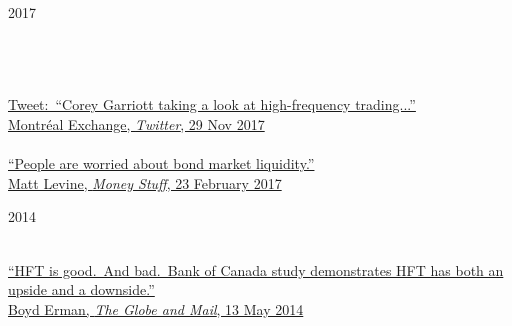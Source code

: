\documentclass[11pt,letterpaper]{article}
\begin{document}
\bigskip

\noindent
\begin{minipage}[ht]{0.15\textwidth}
2017 \\
\\
\\
\\
\end{minipage}
\begin{minipage}[ht]{0.80\textwidth}
\href{https://twitter.com/MtlExchange/status/935898152950992896}{Tweet:~``Corey Garriott taking a look at high-frequency trading...'' \\
Montr\'eal Exchange, \textit{Twitter}, 29 Nov 2017} \\
\\
\href{https://www.bloomberg.com/news/articles/2017-02-23/pboc-is-going-digital-as-mobile-payments-boom-transforms-economy}{``People are worried about bond market liquidity.'' \\
Matt Levine, \textit{Money Stuff}, 23 February 2017}
\end{minipage}

\bigskip

\noindent
\begin{minipage}[ht]{0.15\textwidth}
2014 \\
\\

\end{minipage}
\begin{minipage}[ht]{0.80\textwidth}
\href{https://www.theglobeandmail.com/report-on-business/streetwise/hft-is-good-and-bad/article18643811/}{``HFT is good.~And bad.~Bank of Canada study demonstrates HFT has both an upside and a downside.'' \\
Boyd Erman, \textit{The Globe and Mail}, 13 May 2014}
\end{minipage}
\end{document}
